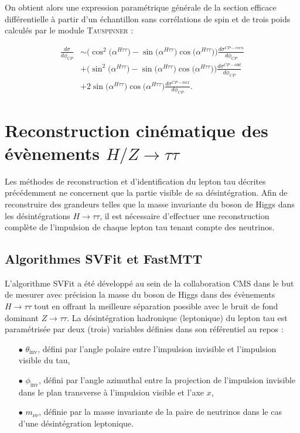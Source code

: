 On obtient alors une expression paramétrique générale de la section efficace différentielle à partir d'un échantillon sans corrélations de spin et de trois poids calculés par le module \textsc{Tauspinner} :

\begin{align}
    \frac{d\sigma}{d\phi_{CP}} & \sim \bigl(\cos^2\bigl(\alpha^{H\tau\tau}\bigr)-\sin\bigl(\alpha^{H\tau\tau}\bigr)\cos\bigl(\alpha^{H\tau\tau}\bigr)\bigr)\frac{d\sigma^{CP-even}}{d\phi_{CP}} \nonumber \\[1em] 
     & + \bigl(\sin^2\bigl(\alpha^{H\tau\tau}\bigr)-\sin\bigl(\alpha^{H\tau\tau}\bigr)\cos\bigl(\alpha^{H\tau\tau}\bigr)\bigr)\frac{d\sigma^{CP-odd}}{d\phi_{CP}} \nonumber \\[1em] 
     & + 2\sin\bigl(\alpha^{H\tau\tau}\bigr)\cos\bigl(\alpha^{H\tau\tau}\bigr)\frac{d\sigma^{CP-mix}}{d\phi_{CP}}.
     \label{CPdiff}
\end{align}

\section{Reconstruction cinématique des évènements $H/Z\rightarrow\tau\tau$}
\label{taualgo}

Les méthodes de reconstruction et d'identification du lepton tau décrites précédemment ne concernent que la partie visible de sa désintégration. Afin de reconstruire des grandeurs telles que la masse invariante du boson de Higgs dans les désintégrations $H\rightarrow\tau\tau$, il est nécessaire d'effectuer une reconstruction complète de l'impulsion de chaque lepton tau tenant compte des neutrinos.

\subsection{Algorithmes SVFit et FastMTT}

L'algorithme SVFit \cite{SVFit} a été développé au sein de la collaboration CMS dans le but de mesurer avec précision la masse du boson de Higgs dans des évènements $H\rightarrow\tau\tau$ tout en offrant la meilleure séparation possible avec le bruit de fond dominant $Z\rightarrow\tau\tau$. La désintégration hadronique (leptonique) du lepton tau est paramétrisée par deux (trois) variables définies dans son référentiel au repos : 

\begin{itemize}
    \medskip
    \item[$\bullet$] $\theta_{\text{inv}}$, défini par l'angle polaire entre l'impulsion invisible et l'impulsion visible du tau,
    \medskip
    \item[$\bullet$] $\phi_{\text{inv}}$, défini par l'angle azimuthal entre la projection de l'impulsion invisible dans le plan transverse à l'impulsion visible et l'axe $x$,
    \medskip
    \item[$\bullet$] $m_{\nu\nu}$, définie par la masse invariante de la paire de neutrinos dans le cas d'une désintégration leptonique.
    \medskip
\end{itemize}

